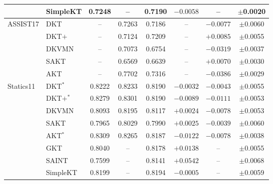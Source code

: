 \begin{table}[t]
{\begin{tabular}{llcccccc}
 & SimpleKT & 0.7248 & -- & 0.7190 & $-0.0058$ & -- & $\pm$0.0020 \\
\midrule
ASSIST17 & DKT & -- & 0.7263 & 0.7186 & -- & $-0.0077$ & $\pm$0.0060 \\
 & DKT$+$ & -- & 0.7124 & 0.7209 & -- & $+0.0085$ & $\pm$0.0055 \\
 & DKVMN & -- & 0.7073 & 0.6754 & -- & $-0.0319$ & $\pm$0.0037 \\
 & SAKT & -- & 0.6569 & 0.6639 & -- & $+0.0070$ & $\pm$0.0030 \\
 & AKT & -- & 0.7702 & 0.7316 & -- & $-0.0386$ & $\pm$0.0029 \\
\midrule
Statics11 & DKT$^\ast$ & 0.8222 & 0.8233 & 0.8190 & $-0.0032$ & $-0.0043$ & $\pm$0.0055 \\
 & DKT$+$$^\ast$ & 0.8279 & 0.8301 & 0.8190 & $-0.0089$ & $-0.0111$ & $\pm$0.0053 \\
 & DKVMN & 0.8093 & 0.8195 & 0.8117 & $+0.0024$ & $-0.0078$ & $\pm$0.0053 \\
 & SAKT & 0.7965 & 0.8029 & 0.7990 & $+0.0025$ & $-0.0039$ & $\pm$0.0060 \\
 & AKT$^\ast$ & 0.8309 & 0.8265 & 0.8187 & $-0.0122$ & $-0.0078$ & $\pm$0.0038 \\
 & GKT & 0.8040 & -- & 0.8178 & $+0.0138$ & -- & $\pm$0.0055 \\
 & SAINT & 0.7599 & -- & 0.8141 & $+0.0542$ & -- & $\pm$0.0068 \\
 & SimpleKT & 0.8199 & -- & 0.8194 & $-0.0005$ & -- & $\pm$0.0059 \\
\bottomrule
\end{tabular}}
\end{table}
